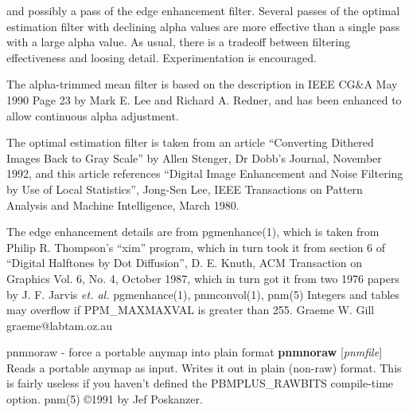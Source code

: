 and possibly a pass of the edge enhancement filter.
Several passes of the optimal estimation filter with declining alpha
values are more effective than a single pass with a large alpha value.
As usual, there is a tradeoff between filtering effectiveness and loosing
detail. Experimentation is encouraged.
\par
The alpha-trimmed mean filter is 
based on the description in IEEE CG\&A May 1990 
Page 23 by Mark E. Lee and Richard A. Redner,
and has been enhanced to allow continuous alpha adjustment.
\par
The optimal estimation filter is taken from an article ``Converting Dithered
Images Back to Gray Scale'' by Allen Stenger, Dr Dobb's Journal, November
1992, and this article references ``Digital Image Enhancement and Noise Filtering by
Use of Local Statistics'', Jong-Sen Lee, IEEE Transactions on Pattern Analysis and
Machine Intelligence, March 1980.
\par
The edge enhancement details are from pgmenhance(1),
which is taken from Philip R. Thompson's ``xim''
program, which in turn took it from section 6 of ``Digital Halftones by
Dot Diffusion'', D. E. Knuth, ACM Transaction on Graphics Vol. 6, No. 4,
October 1987, which in turn got it from two 1976 papers by J. F. Jarvis
{\it et. al.}
pgmenhance(1), pnmconvol(1), pnm(5)
Integers and tables may overflow if PPM\_MAXMAXVAL is greater than 255.
Graeme W. Gill    graeme@labtam.oz.au
%
 
%

\newpage
%

pnmnoraw - force a portable anymap into plain format
{\bf pnmnoraw}
{\rm [}{\it pnmfile}{\rm ]}
Reads a portable anymap as input.
Writes it out in plain (non-raw) format.
This is fairly useless if you haven't defined the PBMPLUS\_RAWBITS
compile-time option.
pnm(5)
\copyright 1991 by Jef Poskanzer.
%
 
